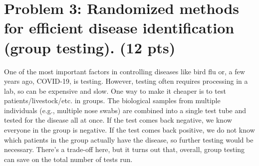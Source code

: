 \documentclass[11pt]{article}
\begin{document}
\section*{Problem 3: Randomized methods for efficient disease identification (group testing). (12 pts)}
One of the most important factors in controlling diseases like bird flu or, a few years ago, COVID-19, is testing. However, testing often requires processing in a lab, so can be expensive and slow. One way to make it cheaper is to test patients/livestock/etc.
in groups. The biological samples from multiple individuals (e.g., multiple nose swabs) are combined into a single test tube and tested for the disease all at once. If the test comes back negative, we know everyone in the group is negative. If the test comes back positive, we do not know which patients in the group actually have the disease, so further testing would be necessary. There's a trade-off here, but it turns out that, overall, group testing can save on the total number of tests run.
\end{document}
